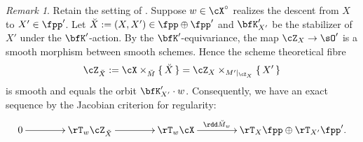 \documentclass[12pt,a4paper]{amsart}
\makeatletter
\newcommand*{\circnuma}[1]{%
  \ifnum#1<1 %
    \@ctrerr
  \else
    \ifnum#1>20 %
      \@ctrerr
    \else
      \mbox{\ding{\numexpr 171+(#1)\relax}}%
     \fi
  \fi
}
\numberwithin{equation}{section}
\theoremstyle{remark}
\newtheorem*{remark}{Remark}
\def\Xo{\cX^\circ}
\def\mstar{{\star}}
\def\ZX{\cZ_{X}}
\makeatother
\begin{document}
\begin{remark} Retain the setting of .
 Suppose $w\in \Xo$ realizes the descent from $X$ to  $X' \in \fpp'$. Let $\dbX :=
  (X,X')\in \fpp\oplus \fpp'$ and
  $\bfK'_{X'}$ be the stabilizer of $X'$ under the $\bfK'$-action.
  By the $\bfK'$-equivariance,  the map $\ZX\rightarrow \sO'$ is  a
  smooth morphism  between smooth schemes.
  Hence the scheme theoretical fibre
  $$\ZdbX := \cX\times_{\dbM}\set{\dbX} = \ZX\times_{M'|_{\ZX}}\set{X'}$$ is
  smooth and equals the orbit $\bfK'_{X'}\cdot w$.
Consequently,  we have an exact sequence by the Jacobian criterion for
regularity:
\begin{equation}\label{eq:DS.T1}
\xymatrix@C=4em{
0 \ar[r] & \rT_w\ZdbX \ar[r] & \rT_w\cX \ar[r]^<>(.5){\rdd \dbM_w} & \rT_X\fpp
\oplus \rT_{X'}\fpp'.
}
\end{equation}
\end{remark}
\end{document}
